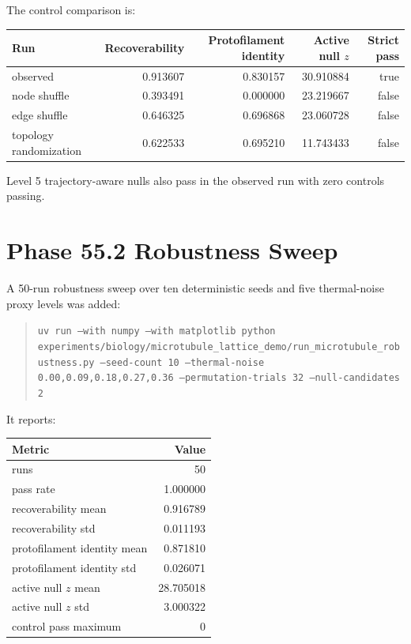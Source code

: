 \documentclass[11pt]{article}
\begin{document}
The control comparison is:
\begin{center}
\begin{tabular}{lrrrr}
\toprule
Run & Recoverability & Protofilament identity & Active null $z$ & Strict pass \\
\midrule
observed & 0.913607 & 0.830157 & 30.910884 & true \\
node shuffle & 0.393491 & 0.000000 & 23.219667 & false \\
edge shuffle & 0.646325 & 0.696868 & 23.060728 & false \\
topology randomization & 0.622533 & 0.695210 & 11.743433 & false \\
\bottomrule
\end{tabular}
\end{center}

Level 5 trajectory-aware nulls also pass in the observed run with zero controls passing.

\section{Phase 55.2 Robustness Sweep}

A 50-run robustness sweep over ten deterministic seeds and five thermal-noise proxy levels was added:
\begin{quote}
\texttt{uv run --with numpy --with matplotlib python experiments/biology/microtubule\_lattice\_demo/run\_microtubule\_robustness.py --seed-count 10 --thermal-noise 0.00,0.09,0.18,0.27,0.36 --permutation-trials 32 --null-candidates 2}
\end{quote}

It reports:
\begin{center}
\begin{tabular}{lr}
\toprule
Metric & Value \\
\midrule
runs & 50 \\
pass rate & 1.000000 \\
recoverability mean & 0.916789 \\
recoverability std & 0.011193 \\
protofilament identity mean & 0.871810 \\
protofilament identity std & 0.026071 \\
active null $z$ mean & 28.705018 \\
active null $z$ std & 3.000322 \\
control pass maximum & 0 \\
\bottomrule
\end{tabular}
\end{center}
\end{document}
